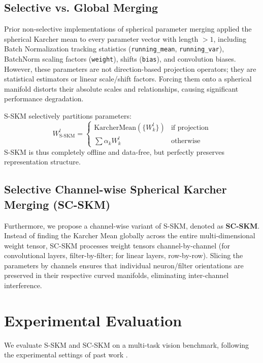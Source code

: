 \documentclass{article}
\begin{document}
\subsection{Selective vs. Global Merging}
Prior non-selective implementations of spherical parameter merging applied the spherical Karcher mean to every parameter vector with length $> 1$, including Batch Normalization tracking statistics (\texttt{running\_mean}, \texttt{running\_var}), BatchNorm scaling factors (\texttt{weight}), shifts (\texttt{bias}), and convolution biases. However, these parameters are not direction-based projection operators; they are statistical estimators or linear scale/shift factors. Forcing them onto a spherical manifold distorts their absolute scales and relationships, causing significant performance degradation. 

S-SKM selectively partitions parameters:
\begin{equation}
W_{\text{S-SKM}}^l = \begin{cases}
\text{KarcherMean}(\{W_k^l\}) & \text{if projection} \\
\sum \alpha_k W_k^l & \text{otherwise}
\end{cases}
\end{equation}
S-SKM is thus completely offline and data-free, but perfectly preserves representation structure.

\subsection{Selective Channel-wise Spherical Karcher Merging (SC-SKM)}
Furthermore, we propose a channel-wise variant of S-SKM, denoted as \textbf{SC-SKM}. Instead of finding the Karcher Mean globally across the entire multi-dimensional weight tensor, SC-SKM processes weight tensors channel-by-channel (for convolutional layers, filter-by-filter; for linear layers, row-by-row). Slicing the parameters by channels ensures that individual neuron/filter orientations are preserved in their respective curved manifolds, eliminating inter-channel interference.

\section{Experimental Evaluation}
We evaluate S-SKM and SC-SKM on a multi-task vision benchmark, following the experimental settings of past work \cite{pragmatist2026ttbc,methodologist2026confounder,anonymous2026dfcalib}.
\end{document}
